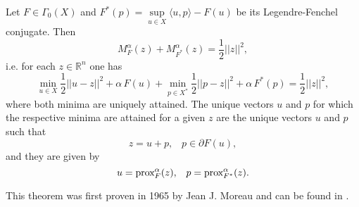     \begin{theorem} %
    \label{def:moreau_identity}

        Let $F \in \Gamma_{0}(X)$ and $F^{\ast}(p) = \sup\limits_{u \in X} \langle u, p \rangle - F(u)$ be its Legendre-Fenchel conjugate. Then
            $$
                M^{\alpha}_{F}(z) + M^{\alpha}_{F^{\ast}}(z) = \frac{1}{2}||z||^{2},
            $$
        i.e. for each $z \in \mathbb{R}^{n}$ one has
            \begin{equation}
                \min_{u \in X} \frac{1}{2} ||u - z||^{2} +  \alpha \, F(u) + \min_{p \in X^{\ast}} \frac{1}{2} ||p - z||^{2} +  \alpha \, F^{\ast}(p) = \frac{1}{2}||z||^{2},
                \label{eq:moreau_identity}
            \end{equation}
        where both minima are uniquely attained. The unique vectors $u$ and $p$ for which the respective minima are attained for a given $z$ are the unique vectors $u$ and $p$ such that
            \begin{equation}
                z = u + p, \,\,\,\,\, p \in \partial F(u),
                \label{eq:equivalence_of_moreau_property}
            \end{equation}
        and they are given by
            $$
                u = \textnormal{prox}^{\alpha}_{F}(z), \,\,\,\,\, p = \textnormal{prox}^{\alpha}_{F^{\ast}}(z).
            $$
    \end{theorem}

    This theorem was first proven in 1965 by Jean J. Moreau and can be found in \cite{Rockafellar}.

